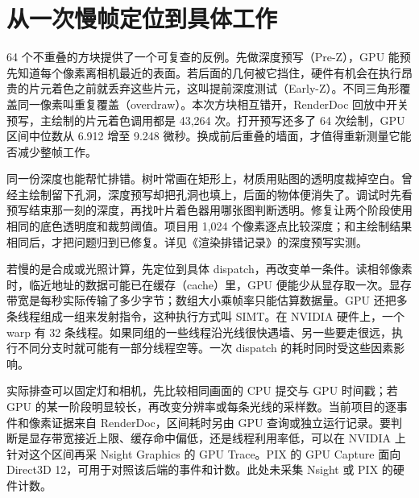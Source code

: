 \clearpage
\section{从一次慢帧定位到具体工作}

64 个不重叠的方块提供了一个可复查的反例。先做深度预写（Pre-Z），GPU 能预先知道每个像素离相机最近的表面。若后面的几何被它挡住，硬件有机会在执行昂贵的片元着色之前就丢弃这些片元，这叫提前深度测试（Early-Z）。不同三角形覆盖同一像素叫重复覆盖（overdraw）。本次方块相互错开，RenderDoc 回放中开关预写，主绘制的片元着色调用都是 43,264 次。打开预写还多了 64 次绘制，GPU 区间中位数从 6.912 增至 9.248 微秒。换成前后重叠的墙面，才值得重新测量它能否减少整帧工作。

同一份深度也能帮忙排错。树叶常画在矩形上，材质用贴图的透明度裁掉空白。曾经主绘制留下孔洞，深度预写却把孔洞也填上，后面的物体便消失了。调试时先看预写结束那一刻的深度，再找叶片着色器用哪张图判断透明。修复让两个阶段使用相同的底色透明度和裁剪阈值。项目用 1,024 个像素逐点比较深度；和主绘制结果相同后，才把问题归到已修复。详见《渲染排错记录》的深度预写实测。

若慢的是合成或光照计算，先定位到具体 dispatch，再改变单一条件。读相邻像素时，临近地址的数据可能已在缓存（cache）里，GPU 便能少从显存取一次。显存带宽是每秒实际传输了多少字节；数组大小乘帧率只能估算数据量。GPU 还把多条线程组成一组来发射指令，这种执行方式叫 SIMT。在 NVIDIA 硬件上，一个 warp 有 32 条线程。如果同组的一些线程沿光线很快遇墙、另一些要走很远，执行不同分支时就可能有一部分线程空等。一次 dispatch 的耗时同时受这些因素影响。

实际排查可以固定灯和相机，先比较相同画面的 CPU 提交与 GPU 时间戳；若 GPU 的某一阶段明显较长，再改变分辨率或每条光线的采样数。当前项目的逐事件和像素证据来自 RenderDoc，区间耗时另由 GPU 查询或独立运行记录。要判断是显存带宽接近上限、缓存命中偏低，还是线程利用率低，可以在 NVIDIA 上针对这个区间再采 Nsight Graphics 的 GPU Trace。PIX 的 GPU Capture 面向 Direct3D 12，可用于对照该后端的事件和计数。此处未采集 Nsight 或 PIX 的硬件计数。

